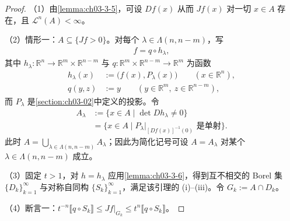 \documentclass[../../main.tex]{subfiles}%
\begin{document}
\begin{proof}
（1）由\cref{lemma:ch03-3-5}，可设 $Df(x)$ 从而 $Jf(x)$ 对一切 $x\in A$ 存在，且 $\mathcal{L}^n(A)<\infty$。%

（2）情形一：$A\subseteq\{Jf>0\}$。对每个 $\lambda\in\Lambda(n,n-m)$，写
\begin{align*}
f=q\circ h_\lambda,
\end{align*}
其中 $h_\lambda:\mathbb{R}^n\to\mathbb{R}^m\times\mathbb{R}^{n-m}$ 与 $q:\mathbb{R}^m\times\mathbb{R}^{n-m}\to\mathbb{R}^m$ 为函数
\begin{align*}
h_\lambda(x)&:=\bigl(f(x),P_\lambda(x)\bigr)\qquad(x\in\mathbb{R}^n),\\
q(y,z)&:=y\qquad(y\in\mathbb{R}^m,\ z\in\mathbb{R}^{n-m}),
\end{align*}
而 $P_\lambda$ 是\cref{section:ch03-02}中定义的投影。令%
\begin{align*}
A_\lambda&:=\{x\in A\mid\det Dh_\lambda\neq0\}\\
&=\{x\in A\mid P_\lambda|_{[Df(x)]^{-1}(0)}\text{ 是单射}\}.
\end{align*}
此时 $A=\bigcup_{\lambda\in\Lambda(n,n-m)}A_\lambda$；因此为简化记号可设 $A=A_\lambda$ 对某个 $\lambda\in\Lambda(n,n-m)$ 成立。

（3）固定 $t>1$，对 $h=h_\lambda$ 应用\cref{lemma:ch03-3-6}，得到互不相交的 Borel 集 $\{D_k\}_{k=1}^{\infty}$ 与对称自同构 $\{S_k\}_{k=1}^{\infty}$，满足该引理的 (i)--(iii)。令 $G_k:=A\cap D_k$。%

（4）断言一：$t^{-n}\llbracket q\circ S_k\rrbracket\leqslant Jf|_{G_k}\leqslant t^n\llbracket q\circ S_k\rrbracket$。


\end{proof}
\end{document}
